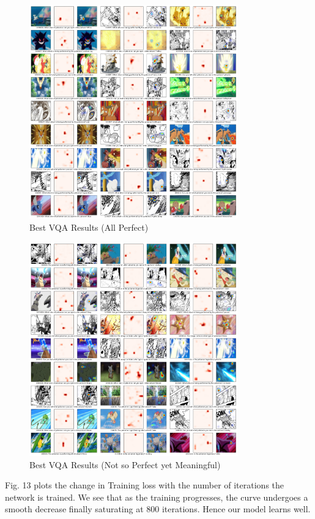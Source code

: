 \documentclass[journal, a4paper]{IEEEtran}
\begin{document}
    \begin{figure}[ht]
        \caption{Best VQA Results (All Perfect)}
    \centering
     \includegraphics[scale = 0.6, width=9cm]{results_9x9_0_best.png}
    \end{figure}
    \begin{figure}[ht]
        \caption{Best VQA Results (Not so Perfect yet Meaningful)}
    \centering
     \includegraphics[scale = 0.6, width=9cm]{results_9x9_0_avg.png}
    \end{figure}
    
   Fig. 13 plots the change in Training loss with the number of iterations the network is trained. We see that as the training progresses, the curve undergoes a smooth decrease finally  saturating at 800 iterations. Hence our model learns well.
    
\end{document}
